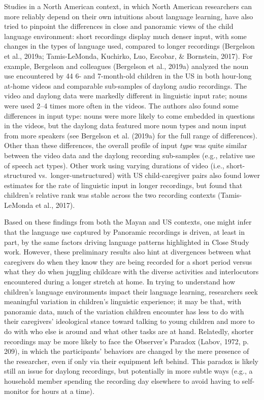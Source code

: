 \documentclass[,man,mask,floatsintext]{apa6}
\begin{document}
Studies in a North American context, in which North American researchers
can more reliably depend on their own intuitions about language
learning, have also tried to pinpoint the differences in close and
panoramic views of the child language environment: short recordings
display much denser input, with some changes in the types of language
used, compared to longer recordings (Bergelson et al., 2019a;
Tamis-LeMonda, Kuchirko, Luo, Escobar, \& Bornstein, 2017). For example,
Bergelson and colleagues (Bergelson et al., 2019a) analyzed the noun use
encountered by 44 6- and 7-month-old children in the US in both
hour-long at-home videos and comparable sub-samples of daylong audio
recordings. The video and daylong data were markedly different in
linguistic input rate; nouns were used 2--4 times more often in the
videos. The authors also found some differences in input type: nouns
were more likely to come embedded in questions in the videos, but the
daylong data featured more noun types and noun input from more speakers
(see Bergelson et al. (2019a) for the full range of differences). Other
than these differences, the overall profile of input \emph{type} was
quite similar between the video data and the daylong recording
sub-samples (e.g., relative use of speech act types). Other work using
varying durations of video (i.e., short-structured
vs.~longer-unstructured) with US child-caregiver pairs also found lower
estimates for the rate of linguistic input in longer recordings, but
found that children's relative rank was stable across the two recording
contexts (Tamis-LeMonda et al., 2017).

Based on these findings from both the Mayan and US contexts, one might
infer that the language use captured by Panoramic recordings is driven,
at least in part, by the same factors driving language patterns
highlighted in Close Study work. However, these preliminary results also
hint at divergences between what caregivers do when they know they are
being recorded for a short period versus what they do when juggling
childcare with the diverse activities and interlocutors encountered
during a longer stretch at home. In trying to understand how children's
language environments impact their language learning, researchers seek
meaningful variation in children's linguistic experience; it may be
that, with panoramic data, much of the variation children encounter has
less to do with their caregivers' ideological stance toward talking to
young children and more to do with who else is around and what other
tasks are at hand. Relatedly, shorter recordings may be more likely to
face the Observer's Paradox (Labov, 1972, p. 209), in which the
participants' behaviors are changed by the mere presence of the
researcher, even if only via their equipment left behind. This paradox
is likely still an issue for daylong recordings, but potentially in more
subtle ways (e.g., a household member spending the recording day
elsewhere to avoid having to self-monitor for hours at a time).
\end{document}
